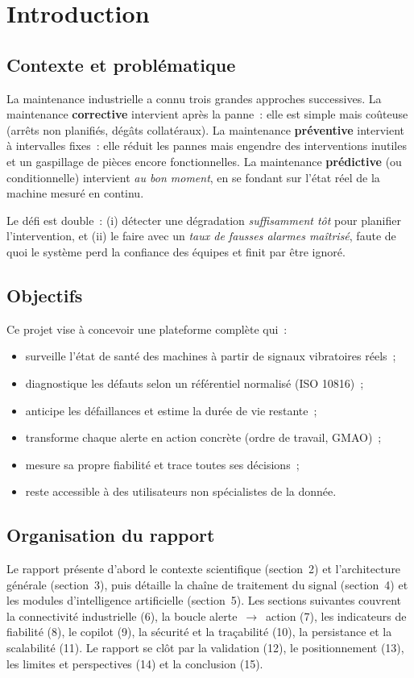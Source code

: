 \documentclass[12pt,a4paper]{article}
\begin{document}
\tableofcontents
\newpage

\section{Introduction}

\subsection{Contexte et problématique}
La maintenance industrielle a connu trois grandes approches successives. La maintenance
\textbf{corrective} intervient après la panne~: elle est simple mais coûteuse (arrêts non
planifiés, dégâts collatéraux). La maintenance \textbf{préventive} intervient à intervalles
fixes~: elle réduit les pannes mais engendre des interventions inutiles et un gaspillage de
pièces encore fonctionnelles. La maintenance \textbf{prédictive} (ou conditionnelle)
intervient \emph{au bon moment}, en se fondant sur l'état réel de la machine mesuré en
continu.

Le défi est double~: (i) détecter une dégradation \emph{suffisamment tôt} pour planifier
l'intervention, et (ii) le faire avec un \emph{taux de fausses alarmes maîtrisé}, faute de
quoi le système perd la confiance des équipes et finit par être ignoré.

\subsection{Objectifs}
Ce projet vise à concevoir une plateforme complète qui~:
\begin{itemize}[leftmargin=1.4em]
  \item surveille l'état de santé des machines à partir de signaux vibratoires réels~;
  \item diagnostique les défauts selon un référentiel normalisé (ISO 10816)~;
  \item anticipe les défaillances et estime la durée de vie restante~;
  \item transforme chaque alerte en action concrète (ordre de travail, GMAO)~;
  \item mesure sa propre fiabilité et trace toutes ses décisions~;
  \item reste accessible à des utilisateurs non spécialistes de la donnée.
\end{itemize}

\subsection{Organisation du rapport}
Le rapport présente d'abord le contexte scientifique (section~2) et l'architecture
générale (section~3), puis détaille la chaîne de traitement du signal (section~4) et les
modules d'intelligence artificielle (section~5). Les sections suivantes couvrent la
connectivité industrielle (6), la boucle alerte~$\rightarrow$~action (7), les indicateurs
de fiabilité (8), le copilot (9), la sécurité et la traçabilité (10), la persistance et la
scalabilité (11). Le rapport se clôt par la validation (12), le positionnement (13), les
limites et perspectives (14) et la conclusion (15).
\end{document}
